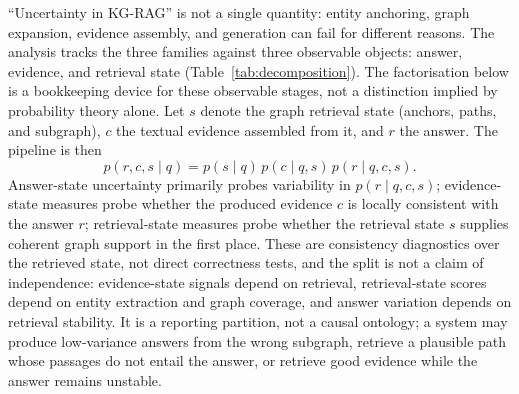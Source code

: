 ``Uncertainty in KG-RAG'' is not a single quantity: entity anchoring, graph
expansion, evidence assembly, and generation can fail for different reasons.
The analysis tracks the three families against three observable
objects: answer, evidence, and retrieval state
(Table~\ref{tab:decomposition}).
The factorisation below is a bookkeeping device for these observable stages,
not a distinction implied by probability theory alone.
Let $s$ denote the graph retrieval state (anchors, paths, and subgraph), $c$
the textual evidence assembled from it, and $r$ the answer. The pipeline is
then
\begin{equation}
  p(r, c, s \mid q) = p(s \mid q)\, p(c \mid q, s)\, p(r \mid q, c, s).
\end{equation}
Answer-state uncertainty primarily probes variability in $p(r \mid q, c, s)$;
evidence-state measures probe whether the produced evidence $c$ is locally
consistent with the answer $r$; retrieval-state measures probe whether the
retrieval state $s$ supplies coherent graph support in the first place.
These are consistency diagnostics over the retrieved state, not direct
correctness tests, and the split is not a claim of independence: evidence-state
signals depend on retrieval, retrieval-state scores depend on entity extraction
and graph coverage, and answer variation depends on retrieval stability.
It is a reporting partition, not a causal ontology; a system may produce
low-variance answers from the wrong subgraph, retrieve a plausible path whose
passages do not entail the answer, or retrieve good evidence while the answer
remains unstable.
